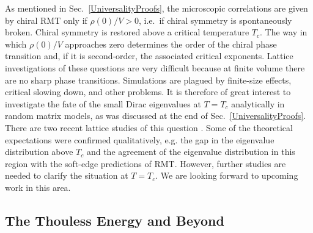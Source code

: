 As mentioned in Sec.~\ref{UniversalityProofs}, the microscopic
correlations are given by chiral RMT only if $\rho(0)/V>0$, i.e.\ if
chiral symmetry is spontaneously broken.  Chiral symmetry is restored
above a critical temperature $T_c$.  The way in which $\rho(0)/V$
approaches zero determines the order of the chiral phase transition
and, if it is second-order, the associated critical exponents.
Lattice investigations of these questions are very difficult because at
finite volume there are no sharp phase transitions.  Simulations are
plagued by 
finite-size effects, critical slowing down, and other problems.  It
is therefore of great interest to investigate the fate of the small
Dirac eigenvalues at $T=T_c$ analytically in random matrix models, as
was discussed at the end of Sec.~\ref{UniversalityProofs}.  There
are two recent lattice studies of this question \cite{Farc99b,Dam00}.
Some 
of the theoretical expectations were confirmed qualitatively, e.g.
the gap in the eigenvalue distribution above $T_c$ and the agreement
of the eigenvalue distribution in this region with the soft-edge
predictions of RMT.  However, further studies are needed to clarify
the situation at $T=T_c$.  We are looking forward to
upcoming work in this area.

\subsection{The Thouless Energy and Beyond}
\label{BeyondThouless}

